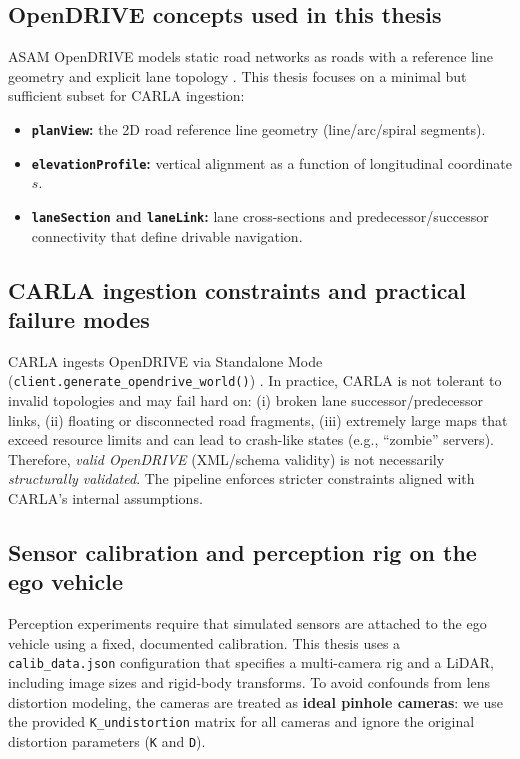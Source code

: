 \subsection{OpenDRIVE concepts used in this thesis}
ASAM OpenDRIVE models static road networks as roads with a reference line geometry and explicit lane topology \cite{asam_opendrive_181}. This thesis focuses on a minimal but sufficient subset for CARLA ingestion:
\begin{itemize}
\item \textbf{\texttt{planView}:} the 2D road reference line geometry (line/arc/spiral segments).
\item \textbf{\texttt{elevationProfile}:} vertical alignment as a function of longitudinal coordinate $s$.
\item \textbf{\texttt{laneSection} and \texttt{laneLink}:} lane cross-sections and predecessor/successor connectivity that define drivable navigation.
\end{itemize}

\subsection{CARLA ingestion constraints and practical failure modes}
CARLA ingests OpenDRIVE via Standalone Mode (\texttt{client.generate\_opendrive\_world()}) \cite{carla_opendrive_standalone}. In practice, CARLA is not tolerant to invalid topologies and may fail hard on:
(i) broken lane successor/predecessor links,
(ii) floating or disconnected road fragments,
(iii) extremely large maps that exceed resource limits and can lead to crash-like states (e.g., ``zombie'' servers).
Therefore, \emph{valid OpenDRIVE} (XML/schema validity) is not necessarily \emph{structurally validated}. The pipeline enforces stricter constraints aligned with CARLA’s internal assumptions.

\subsection{Sensor calibration and perception rig on the ego vehicle}
\label{sec:sensor_setup}

Perception experiments require that simulated sensors are attached to the ego vehicle using a fixed, documented calibration.
This thesis uses a \texttt{calib\_data.json} configuration that specifies a multi-camera rig and a LiDAR, including image sizes and rigid-body transforms.
To avoid confounds from lens distortion modeling, the cameras are treated as \textbf{ideal pinhole cameras}: we use the provided \texttt{K\_undistortion} matrix for all cameras and ignore the original distortion parameters (\texttt{K} and \texttt{D}).

